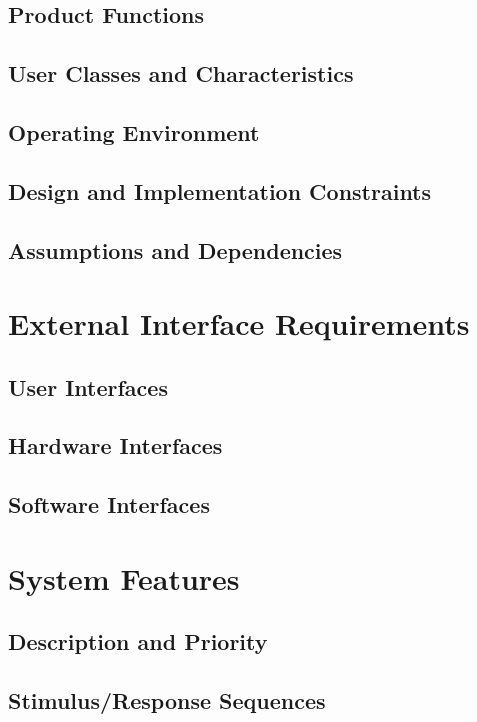 \documentclass{scrreprt}
\begin{document}
\begin{CJK}{UTF8}{nkai}
\section{Product Functions}

\section{User Classes and Characteristics}

\section{Operating Environment}

\section{Design and Implementation Constraints}

\section{Assumptions and Dependencies}


\chapter{External Interface Requirements}

\section{User Interfaces}

\section{Hardware Interfaces}

\section{Software Interfaces}

\chapter{System Features}

\section{Description and Priority}

\section{Stimulus/Response Sequences}


\end{CJK}
\end{document}
